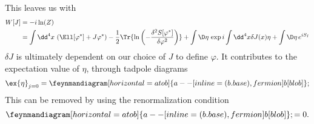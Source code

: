\documentclass{article}
\begin{document}
This leaves us with 
\begin{align}
    \label{generating functional}
    W[J] 
    & = -i \ln(Z) \\
    & = 
    \int\dd^4 x \, \left(\Ell[\varphi^*] + J \varphi^*\right)
    - \frac{1}{2} \Tr{\ln\left( - \frac{\delta^2 S[\varphi^*]}{\delta \varphi^2} \right)}
    + \int \D \eta \, \exp{i \int \dd^4 x \delta J(x) \eta  }
    + \int \D \eta \, e^{iS_I}
\end{align}
$\delta J$ is ultimately dependent on our choice of $J$ to define $\varphi$.
It contributes to the expectation value of $\eta$, through tadpole diagrams
\begin{align}
    \ex{\eta}_{j=0} = 
    \feynmandiagram [horizontal=a to b]{
    a --[inline=(b.base), fermion] b[blob]
    }; 
\end{align}
This can be removed by using the renormalization condition
\begin{equation}
    \feynmandiagram [horizontal=a to b]{
    a --[inline=(b.base), fermion] b[blob]
    };
    = 0.
\end{equation}
\end{document}
